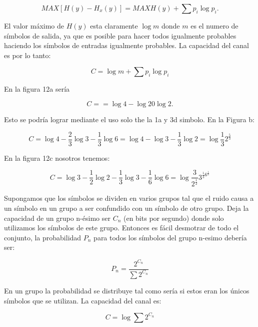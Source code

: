 \documentclass{article}
\begin{document}
\begin{equation}
  MAX [H(y) - H_x(y)] = MAX H(y) + \sum p_i \log{p_i}.
\end{equation}
  
El valor m\'aximo de $H(y)$ esta claramente  $\log{m}$ donde $m$ es el numero de s\'imbolos de salida, ya que es posible para hacer 
todos igualmente probables haciendo los s\'imbolos de entradas igualmente probables. La capacidad del canal es por lo tanto:

\begin{equation}
  C = \log{m} + \sum p_i \log{p_i}
\end{equation}

En la figura 12a ser\'ia 

\begin{equation}
  C = = \log{4} - \log{2} 0 \log{2}.
\end{equation}

Esto se podr\'ia lograr mediante el uso solo the la 1a y 3d simbolo. En la Figura b:

\begin{equation}
  C = \log{4} - \frac{2}{3}\log{3} - \frac{1}{3}\log{6}
  = \log{4} - \log{3} - \frac{1}{3}\log{2}
  = \log{\frac{1}{3}} 2^{\frac{5}{3}}
\end{equation}

En la figura 12c nosotros tenemos:

\begin{equation}
  C = \log{3} - \frac{1}{2}\log{2} - \frac{1}{3}\log{3} - \frac{1}{6} \log{6}
  = \log  {\frac{3}{ 2^{\frac{1}{2}}}} 3^{\frac{1}{3} 6^{\frac{1}{6} }}
\end{equation}

Supongamos que los s\'imbolos se dividen en varios grupos tal que el ruido causa a un s\'imbolo en un grupo a 
ser confundido con un s\'imbolo de otro grupo. Deja la capacidad de un grupo n-\'esimo ser $C_n$ (en bits por segundo)
donde solo utilizamos los s\'imbolos de este grupo. Entonces es f\'acil desmotrar  de todo el conjunto, 
la probabilidad $P_n$ para todos los s\'imbolos del grupo n-esimo deber\'ia ser:

\begin{equation}
  P_n = \frac{2^{C_n}}{\sum 2^{C_n}}
\end{equation}

En un grupo la probabilidad se distribuye tal como ser\'ia si estos eran los \'unicos s\'imbolos que se utilizan. 
La capacidad del canal es:

\begin{equation}
  C = \log{\sum 2^{C_n}}
\end{equation}
\end{document}
